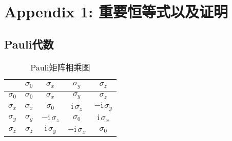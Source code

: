 \chapter{Appendix 1: 重要恒等式以及证明}

\section{Pauli代数}
\begin{table}[htbp!]
	\centering
	\begin{tabular}{c|cccc}
	& $\sigma_0$ & $\sigma_x$ & $\sigma_y$ & $\sigma_z$\\
	\hline
	$\sigma_0$ & $\sigma_0$ & $\sigma_x$ & $\sigma_y$ & $\sigma_z$\\
	$\sigma_x$ & $\sigma_x$ & $\sigma_0$ & $\mathrm{i}\,\sigma_z$ & $-\mathrm{i}\,\sigma_y$\\
	$\sigma_y$ & $\sigma_y$ & $-\mathrm{i}\,\sigma_z$ & $\sigma_0$ & $\mathrm{i}\,\sigma_x$\\
	$\sigma_z$ & $\sigma_z$ & $\mathrm{i}\,\sigma_y$ & $-\mathrm{i}\,\sigma_x$ & $\sigma_0$
	\end{tabular}
  \label{Tab: Appendix_1_Pauli_Matrix_Multiplication}
	\caption{Pauli矩阵相乘图}
\end{table}
